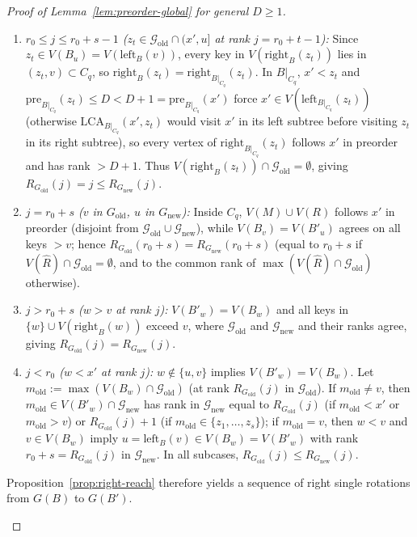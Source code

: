 \documentclass[11pt]{article}
\theoremstyle{definition}
\theoremstyle{remark}
\newcommand{\LCA}{\mathrm{LCA}}
\begin{document}
\begin{proof}[Proof of Lemma~\ref{lem:preorder-global} for general $D \ge 1$]
\begin{itemize}[leftmargin=2em]
  \begin{enumerate}[label=(\roman*)]
    \item \emph{$r_0 \le j \le r_0 + s - 1$ ($z_t \in \mathcal{G}_{\mathrm{old}} \cap (x', u]$ at rank $j = r_0 + t - 1$):} Since $z_t \in V(B_u) = V(\mathrm{left}_B(v))$, every key in $V(\mathrm{right}_B(z_t))$ lies in $(z_t, v) \subset C_q$, so $\mathrm{right}_B(z_t) = \mathrm{right}_{B|_{C_q}}(z_t)$. In $B|_{C_q}$, $x' < z_t$ and $\mathrm{pre}_{B|_{C_q}}(z_t) \le D < D + 1 = \mathrm{pre}_{B|_{C_q}}(x')$ force $x' \in V(\mathrm{left}_{B|_{C_q}}(z_t))$ (otherwise $\LCA_{B|_{C_q}}(x', z_t)$ would visit $x'$ in its left subtree before visiting $z_t$ in its right subtree), so every vertex of $\mathrm{right}_{B|_{C_q}}(z_t)$ follows $x'$ in preorder and has rank $> D + 1$. Thus $V(\mathrm{right}_B(z_t)) \cap \mathcal{G}_{\mathrm{old}} = \emptyset$, giving $R_{G_{\mathrm{old}}}(j) = j \le R_{G_{\mathrm{new}}}(j)$.
    \item \emph{$j = r_0 + s$ ($v$ in $G_{\mathrm{old}}$, $u$ in $G_{\mathrm{new}}$):} Inside $C_q$, $V(M) \cup V(R)$ follows $x'$ in preorder (disjoint from $\mathcal{G}_{\mathrm{old}} \cup \mathcal{G}_{\mathrm{new}}$), while $V(B_v) = V(B'_u)$ agrees on all keys $> v$; hence $R_{G_{\mathrm{old}}}(r_0 + s) = R_{G_{\mathrm{new}}}(r_0 + s)$ (equal to $r_0 + s$ if $V(\widehat{R}) \cap \mathcal{G}_{\mathrm{old}} = \emptyset$, and to the common rank of $\max(V(\widehat{R}) \cap \mathcal{G}_{\mathrm{old}})$ otherwise).
    \item \emph{$j > r_0 + s$ ($w > v$ at rank $j$):} $V(B'_w) = V(B_w)$ and all keys in $\{w\} \cup V(\mathrm{right}_B(w))$ exceed $v$, where $\mathcal{G}_{\mathrm{old}}$ and $\mathcal{G}_{\mathrm{new}}$ and their ranks agree, giving $R_{G_{\mathrm{old}}}(j) = R_{G_{\mathrm{new}}}(j)$.
    \item \emph{$j < r_0$ ($w < x'$ at rank $j$):} $w \notin \{u, v\}$ implies $V(B'_w) = V(B_w)$. Let $m_{\mathrm{old}} := \max(V(B_w) \cap \mathcal{G}_{\mathrm{old}})$ (at rank $R_{G_{\mathrm{old}}}(j)$ in $\mathcal{G}_{\mathrm{old}}$). If $m_{\mathrm{old}} \ne v$, then $m_{\mathrm{old}} \in V(B'_w) \cap \mathcal{G}_{\mathrm{new}}$ has rank in $\mathcal{G}_{\mathrm{new}}$ equal to $R_{G_{\mathrm{old}}}(j)$ (if $m_{\mathrm{old}} < x'$ or $m_{\mathrm{old}} > v$) or $R_{G_{\mathrm{old}}}(j) + 1$ (if $m_{\mathrm{old}} \in \{z_1, \dots, z_s\}$); if $m_{\mathrm{old}} = v$, then $w < v$ and $v \in V(B_w)$ imply $u = \mathrm{left}_B(v) \in V(B_w) = V(B'_w)$ with rank $r_0 + s = R_{G_{\mathrm{old}}}(j)$ in $\mathcal{G}_{\mathrm{new}}$. In all subcases, $R_{G_{\mathrm{old}}}(j) \le R_{G_{\mathrm{new}}}(j)$.
  \end{enumerate}
  Proposition~\ref{prop:right-reach} therefore yields a sequence of right single rotations from $G(B)$ to $G(B')$.\qedhere
\end{itemize}
\end{proof}
\end{document}
